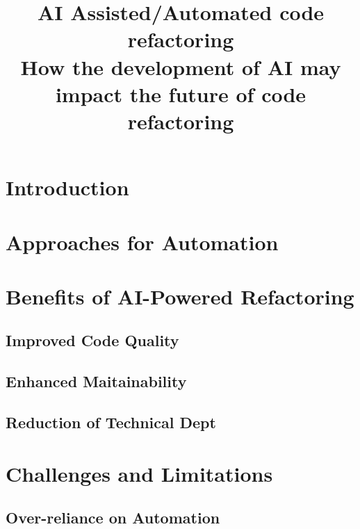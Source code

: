 \documentclass[conference]{IEEEtran}
\begin{document}
\title{AI Assisted/Automated code refactoring\\
{\footnotesize How the development of AI may impact the future of code refactoring}
}

\author{
    \and
}

\maketitle



\section{Introduction}\label{introduction}


\section{Approaches for Automation}\label{automation}

\section{Benefits of AI-Powered Refactoring}\label{benefits}
\subsection{Improved Code Quality}
\subsection{Enhanced Maitainability}
\subsection{Reduction of Technical Dept}

\section{Challenges and Limitations}
\subsection{Over-reliance on Automation}
\end{document}
